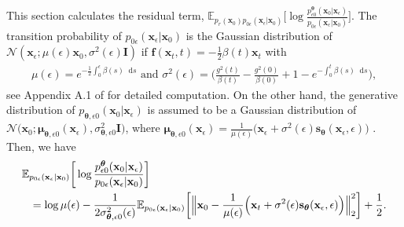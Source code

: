 \documentclass{article}
\theoremstyle{definition}
\theoremstyle{remark}
\newcommand*\diff{\mathop{}\!\mathrm{d}}
\begin{document}
	This section calculates the residual term, $\mathbb{E}_{p_{r}(\mathbf{x}_{0})p_{0\epsilon}(\mathbf{x}_{\epsilon}\vert\mathbf{x}_{0})}\big[\log{\frac{p_{\epsilon 0}^{\bm{\theta}}(\mathbf{x}_{0}\vert\mathbf{x}_{\epsilon})}{p_{0\epsilon}(\mathbf{x}_{\epsilon}\vert\mathbf{x}_{0})}}\big]$.	The transition probability of $p_{0\epsilon}(\mathbf{x}_{\epsilon}\vert\mathbf{x}_{0})$ is the Gaussian distribution of $\mathcal{N}(\mathbf{x}_{\epsilon};\mu(\epsilon)\mathbf{x}_{0},\sigma^{2}(\epsilon)\mathbf{I})$ if $\mathbf{f}(\mathbf{x}_{t},t)=-\frac{1}{2}\beta(t)\mathbf{x}_{t}$ with
	\begin{align*}
	\mu(\epsilon)=e^{-\frac{1}{2}\int_{0}^{\epsilon}\beta(s)\diff s}\text{ and }\sigma^{2}(\epsilon)=\Big(\frac{g^{2}(t)}{\beta(t)}-\frac{g^{2}(0)}{\beta(0)}+1-e^{-\int_{0}^{t}\beta(s)\diff s}\Big),
	\end{align*}
	see Appendix A.1 of \citet{kim2022soft} for detailed computation. On the other hand, the generative distribution of $p_{\bm{\theta},\epsilon 0}(\mathbf{x}_{0}\vert\mathbf{x}_{\epsilon})$ is assumed to be a Gaussian distribution of $\mathcal{N}\big(\mathbf{x}_{0};\bm{\mu}_{\bm{\theta},\epsilon 0}(\mathbf{x}_{\epsilon}),\sigma_{\bm{\theta},\epsilon 0}^{2}\mathbf{I}\big)$, where $\bm{\mu}_{\bm{\theta},\epsilon 0}(\mathbf{x}_{\epsilon})=\frac{1}{\mu(\epsilon)}\big(\mathbf{x}_{\epsilon}+\sigma^{2}(\epsilon)\mathbf{s}_{\bm{\theta}}(\mathbf{x}_{\epsilon},\epsilon)\big)$ \cite{kingma2021variational}. Then, we have
	\begin{eqnarray*}
		\lefteqn{\mathbb{E}_{p_{0\epsilon}(\mathbf{x}_{\epsilon}\vert\mathbf{x}_{0})}\bigg[\log{\frac{p_{\epsilon 0}^{\bm{\theta}}(\mathbf{x}_{0}\vert\mathbf{x}_{\epsilon})}{p_{0\epsilon}(\mathbf{x}_{\epsilon}\vert\mathbf{x}_{0})}}\bigg]}&\\
		&&=\log{\mu(\epsilon)}-\frac{1}{2\sigma_{\bm{\theta},\epsilon 0}^{2}(\epsilon)}\mathbb{E}_{p_{0\epsilon}(\mathbf{x}_{\epsilon}\vert\mathbf{x}_{0})}\bigg[\Big\Vert\mathbf{x}_{0}-\frac{1}{\mu(\epsilon)}\Big(\mathbf{x}_{t}+\sigma^{2}(\epsilon)\mathbf{s}_{\bm{\theta}}(\mathbf{x}_{\epsilon},\epsilon)\Big)\Big\Vert_{2}^{2}\bigg]+\frac{1}{2}.
	\end{eqnarray*}
	
\end{document}
